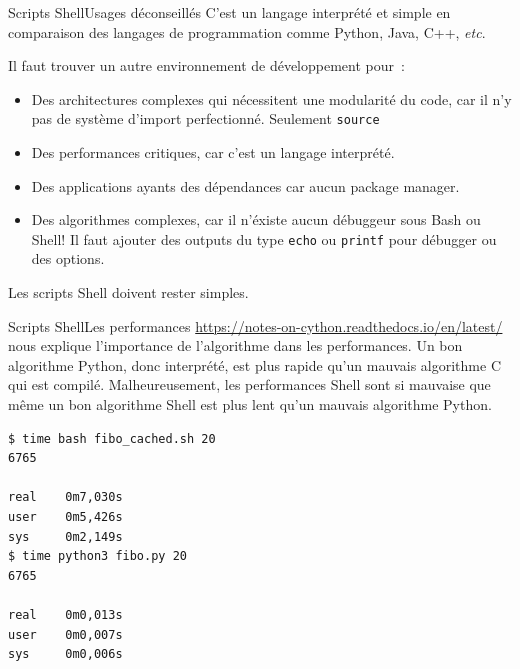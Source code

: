 \documentclass{beamer}
\begin{document}
    \begin{frame}{Scripts Shell}{Usages déconseillés}
        C'est un langage interprété et simple en comparaison des langages de programmation comme Python, Java, C++, \textit{etc}.

        Il faut trouver un autre environnement de développement pour~:
        \begin{itemize}
            \item Des architectures complexes qui nécessitent une modularité du code, car il n'y pas de système d'import perfectionné.
            Seulement \lstinline{source}
            \item Des performances critiques, car c'est un langage interprété.
            \item Des applications ayants des dépendances car aucun package manager.
            \item Des algorithmes complexes, car il n'éxiste aucun débuggeur sous Bash ou Shell!
            Il faut ajouter des outputs du type \lstinline{echo} ou \lstinline{printf} pour débugger ou des options.
        \end{itemize}
        \bigbreak
        Les scripts Shell doivent rester simples.
    \end{frame}

    \begin{frame}[fragile]{Scripts Shell}{Les performances}
        \url{https://notes-on-cython.readthedocs.io/en/latest/} nous explique l'importance de l'algorithme dans les performances.
        Un bon algorithme Python, donc interprété, est plus rapide qu'un mauvais algorithme C qui est compilé.
        \bigbreak
        Malheureusement, les performances Shell sont si mauvaise que même un bon algorithme Shell est plus lent qu'un mauvais algorithme Python.
        \begin{lstlisting}[language=bash]
$ time bash fibo_cached.sh 20
6765

real    0m7,030s
user    0m5,426s
sys     0m2,149s
$ time python3 fibo.py 20
6765

real    0m0,013s
user    0m0,007s
sys     0m0,006s
        \end{lstlisting}
    \end{frame}
\end{document}
